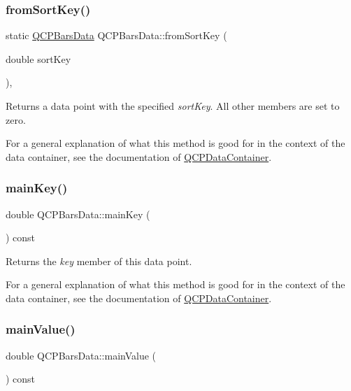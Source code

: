 \subsubsection{\texorpdfstring{from\+Sort\+Key()}{fromSortKey()}}
{\footnotesize\ttfamily static \hyperlink{class_q_c_p_bars_data}{Q\+C\+P\+Bars\+Data} Q\+C\+P\+Bars\+Data\+::from\+Sort\+Key (\begin{DoxyParamCaption}\item[{double}]{sort\+Key }\end{DoxyParamCaption})\hspace{0.3cm}{\ttfamily [inline]}, {\ttfamily [static]}}

Returns a data point with the specified {\itshape sort\+Key}. All other members are set to zero.

For a general explanation of what this method is good for in the context of the data container, see the documentation of \hyperlink{class_q_c_p_data_container}{Q\+C\+P\+Data\+Container}. \mbox{\label{class_q_c_p_bars_data_a8c1d09e63b0e90a6c1fba56ddeaa8964}} 
\subsubsection{\texorpdfstring{main\+Key()}{mainKey()}}
{\footnotesize\ttfamily double Q\+C\+P\+Bars\+Data\+::main\+Key (\begin{DoxyParamCaption}{ }\end{DoxyParamCaption}) const\hspace{0.3cm}{\ttfamily [inline]}}

Returns the {\itshape key} member of this data point.

For a general explanation of what this method is good for in the context of the data container, see the documentation of \hyperlink{class_q_c_p_data_container}{Q\+C\+P\+Data\+Container}. \mbox{\label{class_q_c_p_bars_data_a360d975e587f9e84259aaec172efb10b}} 
\subsubsection{\texorpdfstring{main\+Value()}{mainValue()}}
{\footnotesize\ttfamily double Q\+C\+P\+Bars\+Data\+::main\+Value (\begin{DoxyParamCaption}{ }\end{DoxyParamCaption}) const\hspace{0.3cm}{\ttfamily [inline]}}

